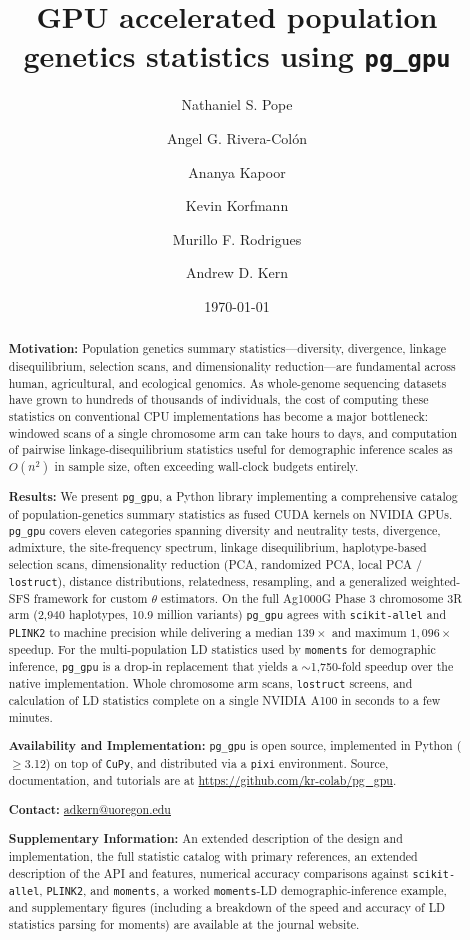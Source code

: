 \documentclass[12pt]{article}
\title{GPU accelerated population genetics statistics using \texttt{pg\_gpu}}
\author[1, 2]{Nathaniel S. Pope}
\author[1, 2]{Angel G. Rivera-Col\'{o}n}
\author[1, 2]{Ananya Kapoor}
\author[3]{Kevin Korfmann}
\author[4]{Murillo F. Rodrigues}
\author[1, 2, *]{Andrew D. Kern}
\affil[1]{\small{Institute of Ecology and Evolution, University of Oregon}}
\affil[2]{\small{Department of Biology, University of Oregon}}
\affil[3]{\small{Department of Biology, University of Pennsylvania}}
\affil[4]{\small{Oregon National Primate Research Center, Oregon Health \& Science University}}
\affil[*]{\small{Corresponding author: \href{mailto:adkern@uoregon.edu}{adkern@uoregon.edu}}}
\date{\small{\today{}}}
\newcommand{\pggpu}{\texttt{pg\_gpu}\xspace}
\newcommand{\scikitallel}{\texttt{scikit-allel}\xspace}
\newcommand{\plinktwo}{\texttt{PLINK2}\xspace}
\newcommand{\moments}{\texttt{moments}\xspace}
\newcommand{\cupy}{\texttt{CuPy}\xspace}
\newcommand{\pixi}{\texttt{pixi}\xspace}
\newcommand{\lostruct}{\texttt{lostruct}\xspace}
\begin{document}
\maketitle

\begin{abstract}
\noindent\textbf{Motivation:} Population genetics summary
statistics---diversity, divergence, linkage disequilibrium, selection
scans, and dimensionality reduction---are fundamental across human,
agricultural, and ecological genomics. As whole-genome sequencing
datasets have grown to hundreds of thousands of individuals, the
cost of computing these statistics on conventional CPU implementations has
become a major bottleneck: windowed scans of a single chromosome arm
can take hours to days, and computation of pairwise linkage-disequilibrium
statistics useful for demographic inference scales as $O(n^2)$ in
sample size, often exceeding wall-clock budgets entirely.

\noindent\textbf{Results:} We present \pggpu, a Python library
implementing a comprehensive catalog of population-genetics summary
statistics as fused CUDA kernels on NVIDIA GPUs. \pggpu covers eleven
categories spanning diversity and neutrality tests, divergence,
admixture, the site-frequency spectrum, linkage disequilibrium,
haplotype-based selection scans, dimensionality reduction (PCA,
randomized PCA, local PCA / \lostruct), distance distributions,
relatedness, resampling, and a generalized weighted-SFS framework for
custom $\theta$ estimators. On the full Ag1000G Phase 3 chromosome 3R
arm (2{,}940 haplotypes, 10.9 million variants) \pggpu agrees with
\scikitallel and \plinktwo to machine precision while delivering a
median $139\times$ and maximum $1{,}096\times$ speedup. For
the multi-population LD statistics used by \moments for demographic inference,
\pggpu is a drop-in replacement that yields a $\sim$1{,}750-fold
speedup over the native implementation. Whole chromosome arm scans, \lostruct screens, and calculation 
of LD statistics complete on a single NVIDIA A100 in
seconds to a few minutes.

\noindent\textbf{Availability and Implementation:} \pggpu is open
source, implemented in Python ($\geq$3.12) on top of \cupy, and
distributed via a \pixi environment. Source, documentation, and
tutorials are at \url{https://github.com/kr-colab/pg_gpu}.

\noindent\textbf{Contact:} \href{mailto:adkern@uoregon.edu}{adkern@uoregon.edu}

\noindent\textbf{Supplementary Information:} An extended description of
the design and implementation, the full statistic catalog with primary
references, an extended description of the API and features, numerical
accuracy comparisons against \scikitallel, \plinktwo, and \moments, a
worked \moments-LD demographic-inference example, and supplementary
figures (including a breakdown of the speed and accuracy of LD statistics parsing for moments) are
available at the journal website.
\end{abstract}
\end{document}
